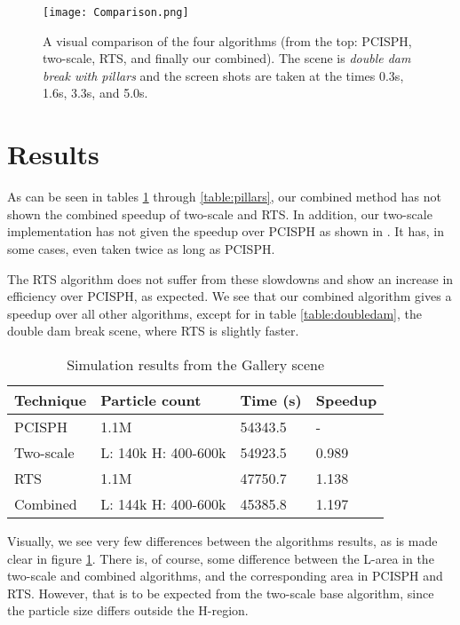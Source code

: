 \documentclass[../../main.tex]{subfiles}
\begin{document}
\begin{figure}[h!]
    \centering
    \texttt{[image: Comparison.png]}
    \caption[Visual comparison of the algorithms]{A visual comparison of the four algorithms (from the top: PCISPH, two-scale, RTS, and finally our combined). The scene is \textit{double dam break with pillars} and the screen shots are taken at the times 0.3s, 1.6s, 3.3s, and 5.0s. }
    \label{fig:comparison}
\end{figure}

\section{Results}

As can be seen in tables \ref{table:gallery} through \ref{table:pillars}, our combined method has not shown the combined speedup of two-scale and RTS. In addition, our two-scale implementation has not given the speedup over PCISPH as shown in \citep{solenthaler2011two}. It has, in some cases, even taken twice as long as PCISPH. 

The RTS algorithm does not suffer from these slowdowns and show an increase in efficiency over PCISPH, as expected. We see that our combined algorithm gives a speedup over all other algorithms, except for in table \ref{table:doubledam}, the double dam break scene, where RTS is slightly faster. 

\begin{table}[]
\centering
\caption{Simulation results from the Gallery scene}
\label{table:gallery}
\begin{tabular}{llll}
\hline
Technique & Particle count      & Time (s) & Speedup \\ \hline
PCISPH    & 1.1M                & 54343.5  & -       \\
Two-scale & L: 140k H: 400-600k & 54923.5  & 0.989   \\
RTS       & 1.1M                & 47750.7  & 1.138   \\
Combined  & L: 144k H: 400-600k & 45385.8  & 1.197   \\ \hline
\end{tabular}
\end{table}


Visually, we see very few differences between the algorithms results, as is made clear in figure \ref{fig:comparison}. There is, of course, some difference between the L-area in the two-scale and combined algorithms, and the corresponding area in PCISPH and RTS. However, that is to be expected from the two-scale base algorithm, since the particle size differs outside the H-region. 
\end{document}
